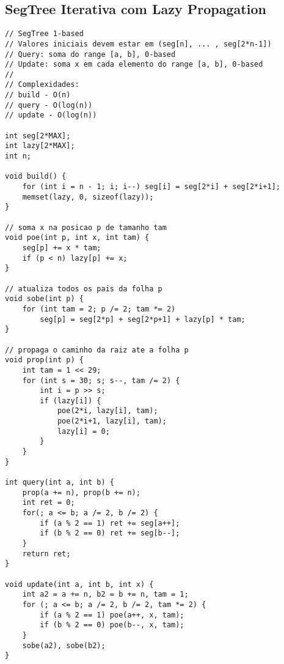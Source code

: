 \documentclass[12pt, a4paper, twoside]{article}
\begin{document}
\subsection{SegTree Iterativa com Lazy Propagation}
\begin{lstlisting}
// SegTree 1-based
// Valores iniciais devem estar em (seg[n], ... , seg[2*n-1])
// Query: soma do range [a, b], 0-based
// Update: soma x em cada elemento do range [a, b], 0-based
//
// Complexidades:
// build - O(n)
// query - O(log(n))
// update - O(log(n))

int seg[2*MAX];
int lazy[2*MAX];
int n;

void build() {
	for (int i = n - 1; i; i--) seg[i] = seg[2*i] + seg[2*i+1];
	memset(lazy, 0, sizeof(lazy));
}

// soma x na posicao p de tamanho tam
void poe(int p, int x, int tam) {
	seg[p] += x * tam;
	if (p < n) lazy[p] += x;
}

// atualiza todos os pais da folha p
void sobe(int p) {
	for (int tam = 2; p /= 2; tam *= 2)
		seg[p] = seg[2*p] + seg[2*p+1] + lazy[p] * tam;
}

// propaga o caminho da raiz ate a folha p
void prop(int p) {
	int tam = 1 << 29;
	for (int s = 30; s; s--, tam /= 2) {
		int i = p >> s;
		if (lazy[i]) {
			poe(2*i, lazy[i], tam);
			poe(2*i+1, lazy[i], tam);
			lazy[i] = 0;
		}
	}
}

int query(int a, int b) {
	prop(a += n), prop(b += n);
	int ret = 0;
	for(; a <= b; a /= 2, b /= 2) {
		if (a % 2 == 1) ret += seg[a++];
		if (b % 2 == 0) ret += seg[b--];
	}
	return ret;
}

void update(int a, int b, int x) {
	int a2 = a += n, b2 = b += n, tam = 1;
	for (; a <= b; a /= 2, b /= 2, tam *= 2) {
		if (a % 2 == 1) poe(a++, x, tam);
		if (b % 2 == 0) poe(b--, x, tam);
	}
	sobe(a2), sobe(b2);
}
\end{lstlisting}
\end{document}
